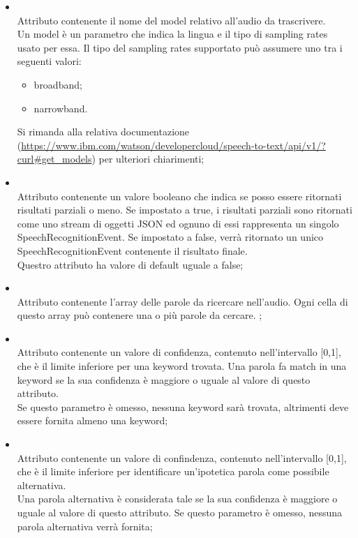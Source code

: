 \begin{itemize}
\begin{itemize}
		\item[]  \\
		Attributo contenente il nome del model relativo all'audio da trascrivere.\\
Un model è un parametro che indica la lingua e il tipo di sampling rates usato per essa.
Il tipo del sampling rates supportato può assumere uno tra i seguenti valori:
\begin{itemize}
\item broadband;
\item narrowband.
\end{itemize}
Si rimanda alla relativa documentazione (\url{https://www.ibm.com/watson/developercloud/speech-to-text/api/v1/?curl#get_models}) per ulteriori chiarimenti;
		\item[]  \\
		Attributo contenente un valore booleano che indica se posso essere ritornati risultati parziali o meno. Se impostato a true, i risultati parziali sono ritornati come uno stream di oggetti JSON ed ognuno di essi rappresenta un singolo SpeechRecognitionEvent. Se impostato a false, verrà ritornato un unico SpeechRecognitionEvent contenente il risultato finale. \\
Questro attributo ha valore di default uguale a false;
		\item[]  \\
		Attributo contenente l'array delle parole da ricercare nell'audio. Ogni cella di questo array può contenere una o più parole da cercare.
;
		\item[]  \\
		Attributo contenente un valore di confidenza, contenuto nell'intervallo [0,1], che è il limite inferiore per una keyword trovata. Una parola fa match in una keyword se la sua confidenza è maggiore o uguale al valore di questo attributo. \\
Se questo parametro è omesso, nessuna keyword sarà trovata, altrimenti deve essere fornita almeno una keyword;
		\item[]  \\
		Attributo contenente un valore di confindenza, contenuto nell'intervallo [0,1], che è il limite inferiore per identificare un'ipotetica parola come possibile alternativa. \\
Una parola alternativa è considerata tale se la sua confidenza è maggiore o uguale al valore di questo attributo. Se questo parametro è omesso, nessuna parola alternativa verrà fornita;

\end{itemize}
\end{itemize}
